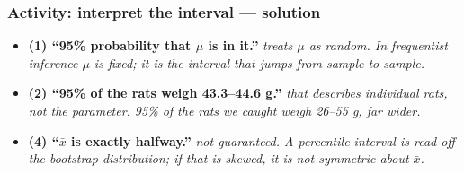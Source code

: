 \documentclass[slidestop,compress,mathserif]{beamer}
\newcommand{\soln}[1]{\textit{#1}}
\begin{document}

\begin{frame}
\frametitle{Activity: interpret the interval --- solution}


\vspace{-0.3em}
{\footnotesize
\begin{itemize}\setlength{\itemsep}{1pt}
\item \textbf{(1) ``95\% probability that $\mu$ is in it.''} \soln{treats $\mu$ as random. In frequentist inference $\mu$ is fixed; it is the \emph{interval} that jumps from sample to sample.}
\item \textbf{(2) ``95\% of the rats weigh 43.3--44.6 g.''} \soln{that describes individual rats, not the parameter. 95\% of the rats we caught weigh 26--55 g, far wider.}
\item \textbf{(4) ``$\bar{x}$ is exactly halfway.''} \soln{not guaranteed. A percentile interval is read off the bootstrap distribution; if that is skewed, it is not symmetric about $\bar{x}$.}
\end{itemize}}

\end{frame}

\end{document}
